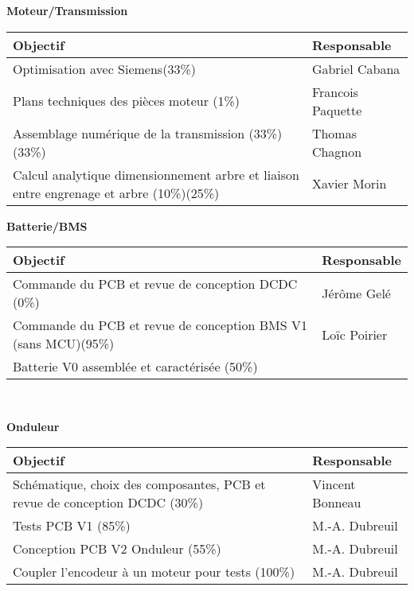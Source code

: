 \textbf{\large Moteur/Transmission}\\
\begin{tabularx}{\linewidth}{
    |>{\hsize=1.75\hsize}X|%
    >{\hsize=0.25\hsize}X|%
  }
    \hline
    \textbf{Objectif} & \textbf{Responsable} \\\hline
     Optimisation avec Siemens(33\%)  & Gabriel Cabana \\\hline
     Plans techniques des pièces moteur (1\%)  & Francois Paquette \\\hline
     Assemblage numérique de la transmission (33\%)(33\%)  &  Thomas Chagnon\\\hline
     Calcul analytique dimensionnement arbre et liaison entre engrenage et arbre (10\%)(25\%) & Xavier Morin\\\hline
\end{tabularx}
\medskip

\textbf{\large Batterie/BMS}
\\
\begin{tabularx}{\linewidth}{
    |>{\hsize=1.75\hsize}X|%
    >{\hsize=0.25\hsize}X|%
  }
    \hline
    \textbf{Objectif} & \textbf{Responsable} \\\hline
    Commande du PCB et revue de conception DCDC (0\%)  & Jérôme Gelé \\\hline 
    Commande du PCB et revue de conception BMS V1 (sans MCU)(95\%) & Loïc Poirier\\\hline
    Batterie V0 assemblée et caractérisée (50\%)
\end{tabularx}\\
\medskip

\textbf{\large Onduleur}\\
\begin{tabularx}{\linewidth}{
    |>{\hsize=1.75\hsize}X|%
    >{\hsize=0.25\hsize}X|%
  }
    \hline
    \textbf{Objectif} & \textbf{Responsable} \\\hline
    Schématique, choix des composantes, PCB et revue de conception DCDC (30\%)  & Vincent Bonneau \\\hline
     Tests PCB V1 (85\%) & M.-A. Dubreuil\\\hline
     Conception PCB V2 Onduleur (55\%) & M.-A. Dubreuil\\\hline
     Coupler l'encodeur à un moteur pour tests (100\%) & M.-A. Dubreuil\\\hline
\end{tabularx}
\medskip

